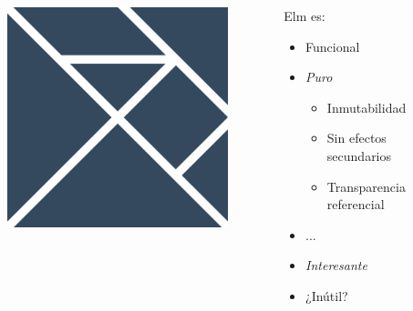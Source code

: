 \documentclass[spanish]{beamer}
\begin{document}
\begin{frame}
  \begin{columns}[onlytextwidth,T]
    \begin{column}{.5\textwidth}
      \begin{figure}
        \includegraphics[scale=0.4]{elm.png}
      \end{figure}
    \end{column}
    \begin{column}{.5\textwidth}
      Elm es:
      \begin{itemize}
      \item<1->
        Funcional
      \item<1->
        \emph{Puro}
        \begin{itemize}
        \item<1->
          Inmutabilidad
        \item<1->
          Sin efectos secundarios
        \item<1->
          Transparencia referencial
        \end{itemize}
      \item<1-> ...
      \end{itemize}
      \begin{itemize}
      \item<2->
        \emph{Interesante}
      \item<3->
        ¿\alert{Inútil}?
      \end{itemize}
    \end{column}
  \end{columns}
\end{frame}

\end{document}
